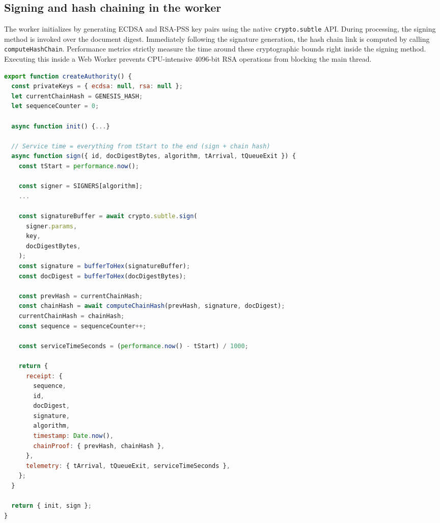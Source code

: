 \documentclass[11pt,a4paper]{article}
\begin{document}
\begin{spacing}{1.1}
\pagebreak
\subsection{Signing and hash chaining in the worker}
The worker initializes by generating ECDSA and RSA-PSS key pairs using the native \texttt{crypto.subtle} API. During processing, the signing method is invoked over the document digest. Immediately following the signature generation, the hash chain link is computed by calling \texttt{computeHashChain}. Performance metrics strictly measure the time around these cryptographic bounds right inside the signing method. Executing this inside a Web Worker prevents CPU-intensive 4096-bit RSA operations from blocking the main thread.


\begin{lstlisting}[language=JavaScript, caption=worker/authority.js]
export function createAuthority() {
  const privateKeys = { ecdsa: null, rsa: null };
  let currentChainHash = GENESIS_HASH;
  let sequenceCounter = 0;

  async function init() {...}

  // Service time = everything from tStart to the end (sign + chain hash)
  async function sign({ id, docDigestBytes, algorithm, tArrival, tQueueExit }) {
    const tStart = performance.now();

    const signer = SIGNERS[algorithm];
    ...

    const signatureBuffer = await crypto.subtle.sign(
      signer.params,
      key,
      docDigestBytes,
    );
    const signature = bufferToHex(signatureBuffer);
    const docDigest = bufferToHex(docDigestBytes);

    const prevHash = currentChainHash;
    const chainHash = await computeChainHash(prevHash, signature, docDigest);
    currentChainHash = chainHash;
    const sequence = sequenceCounter++;

    const serviceTimeSeconds = (performance.now() - tStart) / 1000;

    return {
      receipt: {
        sequence,
        id,
        docDigest,
        signature,
        algorithm,
        timestamp: Date.now(),
        chainProof: { prevHash, chainHash },
      },
      telemetry: { tArrival, tQueueExit, serviceTimeSeconds },
    };
  }

  return { init, sign };
}
\end{lstlisting}

\pagebreak


\end{spacing}
\end{document}
